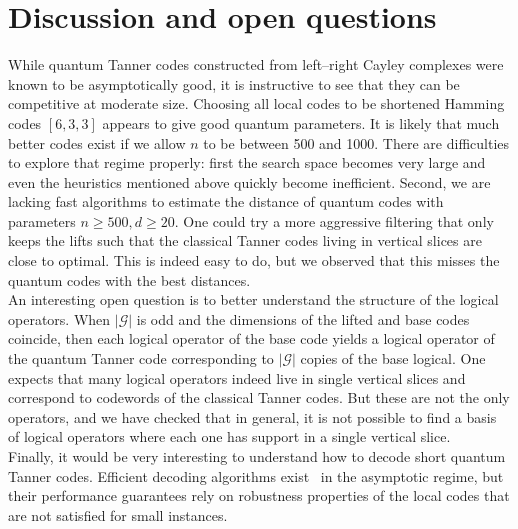 \documentclass[a4paper,onecolumn,11pt]{quantumarticle}
\def\G{\mathcal{G}}
\begin{document}
\begin{table}[t]
\caption{Best quantum Tanner codes found through numerical search. All parity-check matrices are available as auxiliary files on arXiv.}
\label{table}

\end{table}








\section{Discussion and open questions}

While quantum Tanner codes constructed from left--right Cayley complexes were known to be asymptotically good, it is instructive to see that they can be competitive at moderate size. Choosing all local codes to be shortened Hamming codes $[6,3,3]$ appears to give good quantum parameters. 
It is likely that much better codes exist if we allow $n$ to be between 500 and 1000. There are difficulties to explore that regime properly: first the search space becomes very large and even the heuristics mentioned above quickly become inefficient. Second, we are lacking fast algorithms to estimate the distance of quantum codes with parameters $n \geq 500, d \geq 20$.
One could try a more aggressive filtering that only keeps the lifts such that the classical Tanner codes living in vertical slices are close to optimal. This is indeed easy to do, but we observed that this misses the quantum codes with the best distances. \\

An interesting open question is to better understand the structure of the logical operators. When $|\G|$ is odd and the dimensions of the lifted and base codes coincide, then each logical operator of the base code yields a logical operator of the quantum Tanner code corresponding to $|\G|$ copies of the base logical. One expects that many logical operators indeed live in single vertical slices and correspond to codewords of the classical Tanner codes. But these are not the only operators, and we have checked that in general, it is not possible to find a basis of logical operators where each one has support in a single vertical slice. \\


Finally, it would be very interesting to understand how to decode short quantum Tanner codes. Efficient decoding algorithms exist~\cite{LZ25,LZ23} in the asymptotic regime, but their performance guarantees rely on robustness properties of the local codes that are not satisfied for small instances. 
\end{document}
